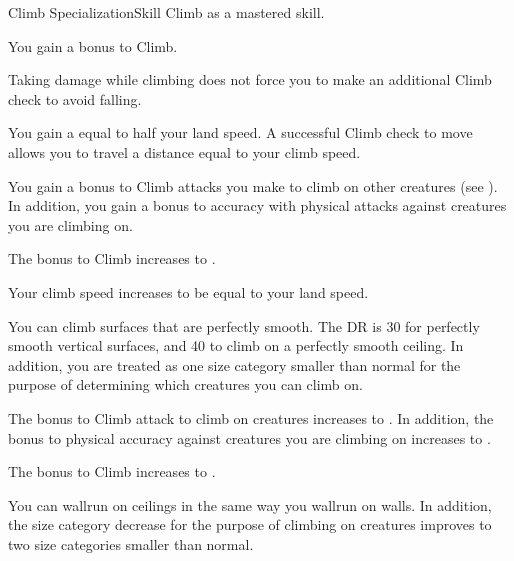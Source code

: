     \begin{feat}{Climb Specialization}{Skill}
        \featpre Climb as a mastered skill.
        \featben

         You gain a  bonus to Climb.

         Taking damage while climbing does not force you to make an additional Climb check to avoid falling.

         You gain a  equal to half your land speed.
        A successful Climb check to move allows you to travel a distance equal to your climb speed.

        You gain a  bonus to Climb attacks you make to climb on other creatures (see ).
        In addition, you gain a  bonus to accuracy with physical attacks against creatures you are climbing on.

         The bonus to Climb increases to .

         Your climb speed increases to be equal to your land speed.

         You can climb surfaces that are perfectly smooth.
        The DR is 30 for perfectly smooth vertical surfaces, and 40 to climb on a perfectly smooth ceiling.
        In addition, you are treated as one size category smaller than normal for the purpose of determining which creatures you can climb on.

         The bonus to Climb attack to climb on creatures increases to .
        In addition, the bonus to physical accuracy against creatures you are climbing on increases to .

         The bonus to Climb increases to .

         You can wallrun on ceilings in the same way you wallrun on walls.
        In addition, the size category decrease for the purpose of climbing on creatures improves to two size categories smaller than normal.
    \end{feat}

